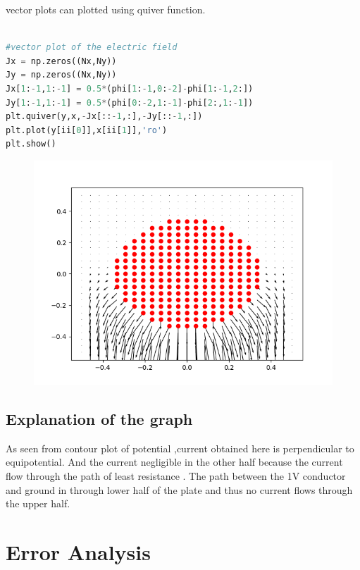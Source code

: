 \documentclass[a4paper]{article}
\begin{document}
vector plots can plotted using quiver function.
\begin{lstlisting}[language=Python]

#vector plot of the electric field
Jx = np.zeros((Nx,Ny))
Jy = np.zeros((Nx,Ny))
Jx[1:-1,1:-1] = 0.5*(phi[1:-1,0:-2]-phi[1:-1,2:])
Jy[1:-1,1:-1] = 0.5*(phi[0:-2,1:-1]-phi[2:,1:-1])
plt.quiver(y,x,-Jx[::-1,:],-Jy[::-1,:])
plt.plot(y[ii[0]],x[ii[1]],'ro')
plt.show()
\end{lstlisting}
\begin{figure}
\caption{}
\includegraphics{Figure_1-5.png}
\end{figure}
\subsection{Explanation of the graph}
As seen from contour plot of potential ,current obtained here is perpendicular to equipotential. And the current negligible in the other half because the current flow through the path of least resistance . The path between the 1V conductor and ground in through lower half of the plate and thus no current flows through the upper half.
\section{Error Analysis}
\end{document}
